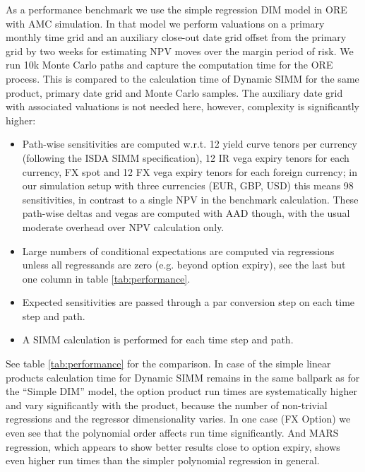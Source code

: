 \documentclass[11pt,a4paper,oneside]{article}
\begin{document}
As a performance benchmark we use the simple regression DIM model in ORE with AMC simulation.
In that model we perform valuations on a primary monthly time grid and an auxiliary close-out date grid offset from the primary grid by two weeks for
estimating NPV moves over the margin period of risk. We run 10k Monte Carlo paths and capture the computation time for the ORE process.
This is compared to the calculation time of Dynamic SIMM for the same product, primary date grid and Monte Carlo samples.
The auxiliary date grid with associated valuations is not needed here, however, complexity is significantly higher:
\begin{itemize}
\item Path-wise sensitivities are computed w.r.t. 12 yield curve tenors per currency (following the ISDA SIMM specification),
  12 IR vega expiry tenors for each currency, FX spot and 12 FX vega expiry tenors for each foreign currency;
  in our simulation setup with three currencies (EUR, GBP, USD) this means 98 sensitivities, in contrast to a single NPV in
  the benchmark calculation. These path-wise deltas and vegas are computed with AAD though, with the usual moderate overhead over NPV calculation only.
\item Large numbers of conditional expectations are computed via regressions unless all regressands are zero (e.g. beyond option expiry), see the last but one column in table \ref{tab:performance}.
\item Expected sensitivities are passed through a par conversion step on each time step and path.
\item A SIMM calculation is performed for each time step and path.
\end{itemize}
See table \ref{tab:performance} for the comparison.
In case of the simple linear products calculation time for Dynamic SIMM remains in the same ballpark as for the ``Simple DIM'' model,
the option product run times are systematically higher and vary significantly with the product, because the number of non-trivial
regressions and the regressor dimensionality varies. In one case (FX Option) we even see that the polynomial order affects run time
significantly. And MARS regression, which appears to show better results close to option expiry, shows even higher run times than the
simpler polynomial regression in general.
\end{document}
